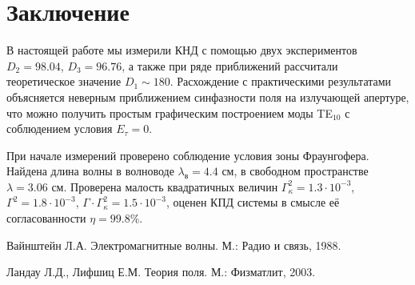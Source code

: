 \documentclass[a4paper,14pt]{extarticle}
\begin{document}
\section*{Заключение}
В настоящей работе мы измерили КНД с помощью двух экспериментов $D_2=98.04$, $D_3=96.76$, а также при ряде приближений рассчитали теоретическое значение $D_1\sim 180$. Расхождение с практическими результатами объясняется неверным приближением синфазности поля на излучающей апертуре, что можно получить простым графическим построением моды TE${}_{10}$ с соблюдением условия $E_\tau=0$.

При начале измерений проверено соблюдение условия зоны Фраунгофера. Найдена длина волны в волноводе $\lambda_\text{в}=4.4$ см, в свободном пространстве $\lambda=3.06$ см. Проверена малость квадратичных величин $\Gamma_\kappa^2=1.3\cdot10^{-3}$, $\Gamma^2=1.8\cdot10^{-3}$, $\Gamma\cdot\Gamma_\kappa^2=1.5\cdot10^{-3}$, оценен КПД системы в смысле её согласованности $\eta=99.8\%$.

\begin{thebibliography}{}

   Вайнштейн Л.А. Электромагнитные волны. М.: Радио и связь, 1988.

   Ландау Л.Д., Лифшиц Е.М. Теория поля. М.: Физматлит, 2003.
\end{thebibliography}
\end{document}
